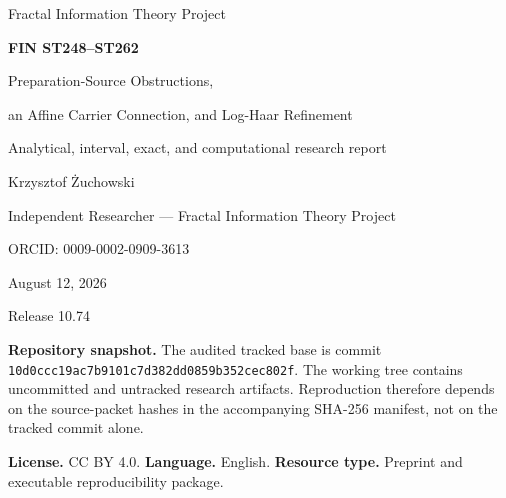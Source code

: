 \documentclass[11pt,a4paper]{article}
\begin{document}
\hypersetup{pageanchor=false}
\begin{titlepage}
\centering
\vspace*{1.0cm}
{\Large Fractal Information Theory Project\par}
\vspace{0.9cm}
{\huge\bfseries FIN ST248--ST262\par}
\vspace{0.4cm}
{\LARGE Preparation-Source Obstructions,\par}
{\LARGE an Affine Carrier Connection, and Log-Haar Refinement\par}
\vspace{1.0cm}
{\large Analytical, interval, exact, and computational research report\par}
\vfill
{\Large Krzysztof \.{Z}uchowski\par}
\vspace{0.2cm}
{\large Independent Researcher --- Fractal Information Theory Project\par}
{\large ORCID: 0009-0002-0909-3613\par}
\vspace{0.8cm}
{\large August 12, 2026\par}
\vspace{0.3cm}
{\large Release 10.74\par}
\vfill
\begin{minipage}{0.92\textwidth}
\small
\textbf{Repository snapshot.} The audited tracked base is commit
\texttt{10d0ccc19ac7b9101c7d382dd0859b352cec802f}. The working tree contains
uncommitted and untracked research artifacts. Reproduction therefore depends on the
source-packet hashes in the accompanying SHA-256 manifest, not on the tracked commit alone.

\medskip
\textbf{License.} CC BY 4.0. \quad \textbf{Language.} English. \quad
\textbf{Resource type.} Preprint and executable reproducibility package.
\end{minipage}
\end{titlepage}
\hypersetup{pageanchor=true}
\end{document}
